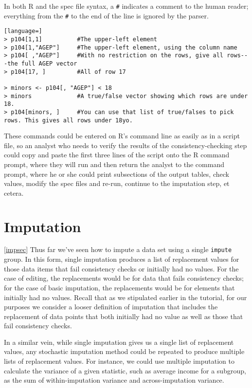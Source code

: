 \documentclass{article}
\begin{document}
In both R and the spec file syntax, a {\tt \#} indicates a comment to the human
reader; everything from the {\tt \#} to the end of the line is ignored by the parser.

\begin{lstlisting}[language=]
> p104[1,1]          #The upper-left element
> p104[1,"AGEP"]     #The upper-left element, using the column name
> p104[ ,"AGEP"]     #With no restriction on the rows, give all rows---the full AGEP vector
> p104[17, ]         #All of row 17

> minors <- p104[, "AGEP"] < 18
> minors             #A true/false vector showing which rows are under 18.
> p104[minors, ]     #You can use that list of true/falses to pick rows. This gives all rows under 18yo.
\end{lstlisting}

These commands could be entered on R's command line as easily as in a script file, so an
analyst who needs to verify the results of the consistency-checking step could copy and
paste the first three lines of the script onto the R command prompt, where they will run and
then return the analyst to the command prompt, where he or she could print subsections of
the output tables, check values, modify the spec files and re-run, continue to the
imputation step, et cetera.


\section{Imputation}\ref{impsec}
Thus far we've seen how to impute a data set using a single {\tt impute} group. In this form, single 
imputation produces a list of replacement values for those data items that fail consistency checks 
or initially had no values. For the case of editing, the replacements would be for data that fails 
consistency checks; for the case of basic imputation, the replacements would be for elements that
initially had no values. Recall that as we stipulated earlier in the tutorial, for our purposes we 
consider a looser definition of imputation that includes the replacement of data points that both 
initially had no value as well as those that fail consistency checks.

In a similar vein, while single imputation gives us a single list of replacement values, any stochastic 
imputation method could be repeated to produce multiple lists of replacement values. For instance, 
we could use multiple imputation to calculate the variance of a given statistic, such as average 
income for a subgroup, as the sum of within-imputation variance and across-imputation variance.
\end{document}
